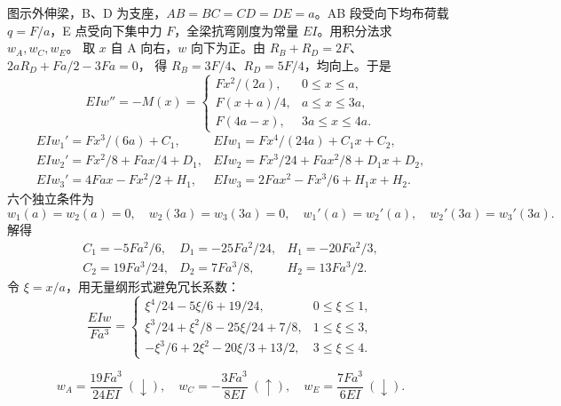 \documentclass[a4paper,10pt,fontset=none]{ctexart}
\begin{document}
图示外伸梁，B、D 为支座，$AB=BC=CD=DE=a$。AB 段受向下均布荷载 $q=F/a$，E 点受向下集中力 $F$，全梁抗弯刚度为常量 $EI$。用积分法求 $w_A,w_C,w_E$。
取 $x$ 自 A 向右，$w$ 向下为正。由 $R_B+R_D=2F$、$2aR_D+Fa/2-3Fa=0$，
得 $R_B=3F/4$、$R_D=5F/4$，均向上。于是
\[
EIw''=-M(x)=\begin{cases}
Fx^2/(2a),&0\le x\le a,\\
F(x+a)/4,&a\le x\le3a,\\
F(4a-x),&3a\le x\le4a.
\end{cases}
\]
\[
\begin{array}{ll}
EIw_1'=Fx^3/(6a)+C_1,&EIw_1=Fx^4/(24a)+C_1x+C_2,\\
EIw_2'=Fx^2/8+Fax/4+D_1,&EIw_2=Fx^3/24+Fax^2/8+D_1x+D_2,\\
EIw_3'=4Fax-Fx^2/2+H_1,&EIw_3=2Fax^2-Fx^3/6+H_1x+H_2.
\end{array}
\]
六个独立条件为
\[
w_1(a)=w_2(a)=0,\quad w_2(3a)=w_3(3a)=0,\quad
w_1'(a)=w_2'(a),\quad w_2'(3a)=w_3'(3a).
\]
解得
\[
\begin{array}{lll}
C_1=-5Fa^2/6,&D_1=-25Fa^2/24,&H_1=-20Fa^2/3,\\
C_2=19Fa^3/24,&D_2=7Fa^3/8,&H_2=13Fa^3/2.
\end{array}
\]
令 $\xi=x/a$，用无量纲形式避免冗长系数：
\[
\frac{EIw}{Fa^3}=\begin{cases}
\xi^4/24-5\xi/6+19/24,&0\le\xi\le1,\\
\xi^3/24+\xi^2/8-25\xi/24+7/8,&1\le\xi\le3,\\
-\xi^3/6+2\xi^2-20\xi/3+13/2,&3\le\xi\le4.
\end{cases}
\]
\begin{answerbox}
\[
\boxed{w_A=\frac{19Fa^3}{24EI}\ (\downarrow)},\quad
\boxed{w_C=-\frac{3Fa^3}{8EI}\ (\uparrow)},\quad
\boxed{w_E=\frac{7Fa^3}{6EI}\ (\downarrow)}.
\]
\end{answerbox}
\end{document}
